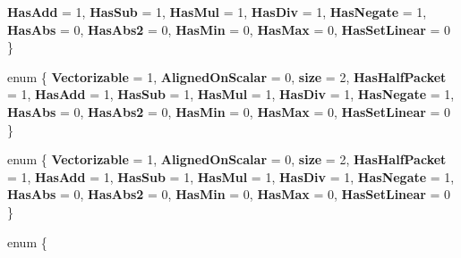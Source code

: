 \begin{DoxyCompactItemize}
\newline
{\bfseries Has\+Add} = 1, 
{\bfseries Has\+Sub} = 1, 
{\bfseries Has\+Mul} = 1, 
{\bfseries Has\+Div} = 1, 
\newline
{\bfseries Has\+Negate} = 1, 
{\bfseries Has\+Abs} = 0, 
{\bfseries Has\+Abs2} = 0, 
{\bfseries Has\+Min} = 0, 
\newline
{\bfseries Has\+Max} = 0, 
{\bfseries Has\+Set\+Linear} = 0
 \}
\item 
\mbox{\label{struct_eigen_1_1internal_1_1packet__traits_3_01std_1_1complex_3_01double_01_4_01_4_a32ff3f1a1e5b4c82616a6c9e94a67933}} 
enum \{ \newline
{\bfseries Vectorizable} = 1, 
{\bfseries Aligned\+On\+Scalar} = 0, 
{\bfseries size} = 2, 
{\bfseries Has\+Half\+Packet} = 1, 
\newline
{\bfseries Has\+Add} = 1, 
{\bfseries Has\+Sub} = 1, 
{\bfseries Has\+Mul} = 1, 
{\bfseries Has\+Div} = 1, 
\newline
{\bfseries Has\+Negate} = 1, 
{\bfseries Has\+Abs} = 0, 
{\bfseries Has\+Abs2} = 0, 
{\bfseries Has\+Min} = 0, 
\newline
{\bfseries Has\+Max} = 0, 
{\bfseries Has\+Set\+Linear} = 0
 \}
\item 
\mbox{\label{struct_eigen_1_1internal_1_1packet__traits_3_01std_1_1complex_3_01double_01_4_01_4_a5b4591d971736538dafac205f630aafb}} 
enum \{ \newline
{\bfseries Vectorizable} = 1, 
{\bfseries Aligned\+On\+Scalar} = 0, 
{\bfseries size} = 2, 
{\bfseries Has\+Half\+Packet} = 1, 
\newline
{\bfseries Has\+Add} = 1, 
{\bfseries Has\+Sub} = 1, 
{\bfseries Has\+Mul} = 1, 
{\bfseries Has\+Div} = 1, 
\newline
{\bfseries Has\+Negate} = 1, 
{\bfseries Has\+Abs} = 0, 
{\bfseries Has\+Abs2} = 0, 
{\bfseries Has\+Min} = 0, 
\newline
{\bfseries Has\+Max} = 0, 
{\bfseries Has\+Set\+Linear} = 0
 \}
\item 
\mbox{\label{struct_eigen_1_1internal_1_1packet__traits_3_01std_1_1complex_3_01double_01_4_01_4_adce2978951cae0b602c00bc8536243e0}} 
enum \{ \newline

\end{DoxyCompactItemize}
